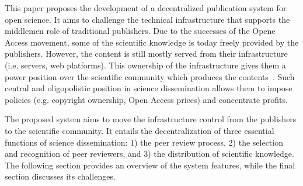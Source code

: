This paper proposes the development of a decentralized publication system for
open science. It aims to challenge the technical infrastructure that supports
the middlemen role of traditional publishers. Due to the successes of the Opene
Access movement, some of the scientific knowledge is today freely provided by
the publishers. However, the content is still mostly served from their
infrastructure (i.e. servers, web platforms). This ownership of the
infrastructure gives them a power position over the scientific community which
produces the contents~\cite{fuster2010governance}. Such central and
oligopolistic position in science dissemination allows them to impose policies
(e.g. copyright ownership, Open Access prices) and concentrate profits.

The proposed system aims to move the infrastructure control from the publishers
to the scientific community. It entails the decentralization of three essential
functions of science dissemination: 1) the peer review process, 2) the selection
and recognition of peer reviewers, and 3) the distribution of scientific
knowledge. The following section provides an overview of the system features,
while the final section discusses its challenges.
